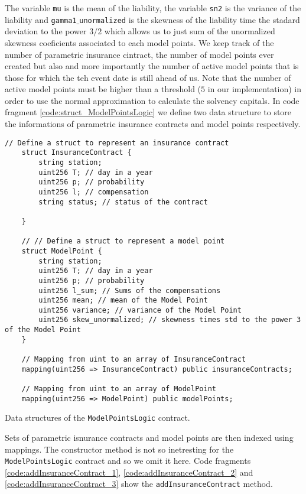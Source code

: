 \documentclass[10pt]{article}
\begin{document}
The variable \texttt{mu} is the mean of the liability, the variable \texttt{sn2} is the variance of the liability and \texttt{gamma1$\_$unormalized} is the skewness of the liability time the stadard deviation to the power $3/2$ which allows us to just sum of the unormalized skewness coeficients associated to each model points. We keep track of the number of parametric insurance cintract, the number of model points ever created but also and more importantly the number of active model points that is those for which the teh event date is still ahead of us. Note that the number of active model points must be higher than a threshold ($5$ in our implementation) in order to use the normal approximation to calculate the solvency capitals. In code fragment \ref{code:struct_ModelPointsLogic}  we define two data structure to store the informations of parametric insurance contracts and model points respectively. 

\begin{codefragment}[!h]
\begin{lstlisting}[language=Solidity]
    // Define a struct to represent an insurance contract
    struct InsuranceContract {
        string station;
        uint256 T; // day in a year
        uint256 p; // probability
        uint256 l; // compensation
        string status; // status of the contract

    }

    // // Define a struct to represent a model point
    struct ModelPoint {
        string station;
        uint256 T; // day in a year
        uint256 p; // probability
        uint256 l_sum; // Sums of the compensations
        uint256 mean; // mean of the Model Point
        uint256 variance; // variance of the Model Point
        uint256 skew_unormalized; // skewness times std to the power 3 of the Model Point
    }

    // Mapping from uint to an array of InsuranceContract
    mapping(uint256 => InsuranceContract) public insuranceContracts;

    // Mapping from uint to an array of ModelPoint
    mapping(uint256 => ModelPoint) public modelPoints;
\end{lstlisting}
    \caption{Data structures of the \texttt{ModelPointsLogic} contract.}
    \label{code:struct_ModelPointsLogic}
\end{codefragment}

Sets of parametric isnurance contracts and model points are then indexed using mappings. The constructor method is not so inetresting for the \texttt{ModelPointsLogic} contract and so we omit it here. Code fragments \ref{code:addInsuranceContract_1}, \ref{code:addInsuranceContract_2} and \ref{code:addInsuranceContract_3} show the \texttt{addInsuranceContract} method.
\end{document}
